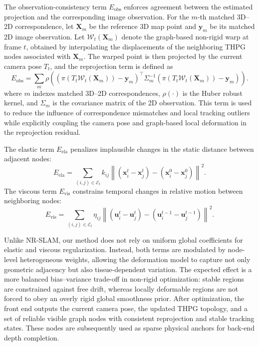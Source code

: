\documentclass[pdflatex,sn-mathphys-num]{sn-jnl}
\begin{document}
The observation-consistency term $E_{\mathrm{obs}}$ enforces agreement between the estimated projection and the corresponding image observation. For the $m$-th matched 3D--2D correspondence, let $\mathbf{X}_m$ be the reference 3D map point and $\mathbf{y}_m$ be its matched 2D image observation. Let $\mathcal{W}_t(\mathbf{X}_m)$ denote the graph-based non-rigid warp at frame $t$, obtained by interpolating the displacements of the neighboring THPG nodes associated with $\mathbf{X}_m$. The warped point is then projected by the current camera pose $T_t$, and the reprojection term is defined as
\begin{equation}
E_{\mathrm{obs}} = \sum_m \rho\!\left(\left(\pi\!\left(T_t\mathcal{W}_t(\mathbf{X}_m)\right) - \mathbf{y}_m\right)^\top \Sigma_m^{-1} \left(\pi\!\left(T_t\mathcal{W}_t(\mathbf{X}_m)\right) - \mathbf{y}_m\right)\right).
\label{eq:obs}
\end{equation}
where $m$ indexes matched 3D--2D correspondences, $\rho(\cdot)$ is the Huber robust kernel, and $\Sigma_m$ is the covariance matrix of the 2D observation. This term is used to reduce the influence of correspondence mismatches and local tracking outliers while explicitly coupling the camera pose and graph-based local deformation in the reprojection residual.

The elastic term $E_{\mathrm{ela}}$ penalizes implausible changes in the static distance between adjacent nodes:
\begin{equation}
E_{\mathrm{ela}} = \sum_{(i,j)\in\mathcal{E}_t} k_{ij} \left\lVert \left(\mathbf{x}_i^t - \mathbf{x}_j^t\right) - \left(\mathbf{x}_i^0 - \mathbf{x}_j^0\right) \right\rVert^2.
\label{eq:ela}
\end{equation}
The viscous term $E_{\mathrm{vis}}$ constrains temporal changes in relative motion between neighboring nodes:
\begin{equation}
E_{\mathrm{vis}} = \sum_{(i,j)\in\mathcal{E}_t} \eta_{ij} \left\lVert \left(\mathbf{u}_i^t - \mathbf{u}_j^t\right) - \left(\mathbf{u}_i^{t-1} - \mathbf{u}_j^{t-1}\right) \right\rVert^2.
\label{eq:vis}
\end{equation}

Unlike NR-SLAM, our method does not rely on uniform global coefficients for elastic and viscous regularization. Instead, both terms are modulated by node-level heterogeneous weights, allowing the deformation model to capture not only geometric adjacency but also tissue-dependent variation. The expected effect is a more balanced bias--variance trade-off in non-rigid optimization: stable regions are constrained against free drift, whereas locally deformable regions are not forced to obey an overly rigid global smoothness prior. After optimization, the front end outputs the current camera pose, the updated THPG topology, and a set of reliable visible graph nodes with consistent reprojection and stable tracking states. These nodes are subsequently used as sparse physical anchors for back-end depth completion.
\end{document}
